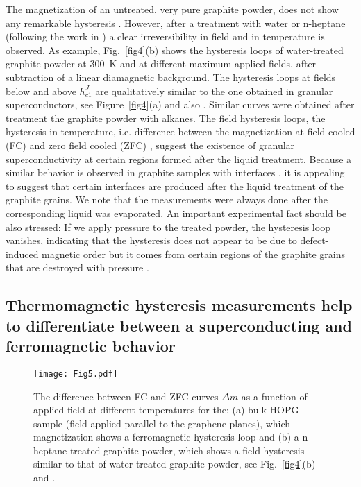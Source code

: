 \documentclass[aps,dvipsnames,twocolumn,floatfix,amsmath]{revtex4-1}
\begin{document}
The magnetization of an untreated, very pure graphite powder, does
not show any remarkable hysteresis \cite{sch12}. However, after a
treatment  with water \cite{sch12} or n-heptane (following the
work in \cite{kaw13}) a clear irreversibility in field and in
temperature is observed. As example,  Fig.~\ref{fig4}(b) shows the
hysteresis loops of water-treated graphite powder at 300~K and at
different maximum applied fields, after subtraction of a linear
diamagnetic background. The hysteresis loops at fields below and
above $h_{c1}^J$ are qualitatively similar to the one obtained in
granular superconductors, see Figure~\ref{fig4}(a) and also
\cite{and01,sen91}. Similar curves were obtained after treatment
the graphite powder with alkanes. The field hysteresis loops, the
hysteresis in temperature, i.e. difference between the
magnetization at field cooled (FC) and zero field cooled (ZFC)
\cite{sch12}, suggest the existence of granular superconductivity
at certain regions formed after the liquid treatment. Because a
similar behavior is observed in graphite samples with interfaces
\cite{schcar}, it is appealing to suggest that certain interfaces
are produced after the liquid treatment of the graphite grains. We
note that the measurements were always done after the
corresponding liquid was evaporated. An important experimental
fact should be also stressed: If we apply pressure to the treated
powder, the hysteresis loop vanishes, indicating that the
hysteresis does not appear to be due to defect-induced magnetic
order but it comes from   certain regions of the graphite grains
that are destroyed with pressure \cite{sch12}.


\subsection{Thermomagnetic hysteresis measurements help to differentiate between a superconducting and ferromagnetic
behavior}

\begin{figure}
  \texttt{[image: Fig5.pdf]}
\caption{The difference between FC and ZFC curves $\Delta m$ as a
function of applied field at different temperatures for the: (a)
bulk HOPG sample (field applied parallel to the graphene planes),
which magnetization shows a ferromagnetic hysteresis loop and (b)
a n-heptane-treated graphite powder, which shows a field
hysteresis similar to that of water treated graphite powder, see
Fig.~\ref{fig4}(b) and \cite{sch12}.}
\label{fig5}       %
\end{figure}
\end{document}
